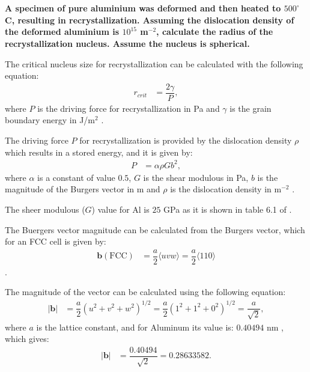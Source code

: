 \newpage
\section{}

\textbf{A specimen of pure aluminium was deformed and then heated to $500^{\circ}$C, resulting in recrystallization. Assuming the dislocation density of the deformed aluminium is $10^{15}$ m$^{-2}$, calculate the radius of the recrystallization nucleus. Assume the nucleus is spherical.}

The critical nucleus size for recrystallization can be calculated with the following equation:
\begin{align}
    \label{eq:r_recrystallization}
    r_{crit}&=\dfrac{2\gamma}{P},
\end{align}
where $P$ is the driving force for recrystallization in Pa and $\gamma$ is the grain boundary energy in J/m$^2$ \citep[p.~283]{rollett2017recrystallization}.

The driving force $P$ for recrystallization is provided by the dislocation density $\rho$ which results in a stored energy, and it is given by:
\begin{align}
    \label{eq:drivin_force}
    P&=\alpha \rho Gb^2,
\end{align}
where $\alpha$ is a constant of value $0.5$, $G$ is the shear modulous in Pa, $b$ is the magnitude of the Burgers vector in m and $\rho$ is the dislocation density in m$^{-2}$ \citep[p.~249]{rollett2017recrystallization}.

The sheer modulous ($G$) value for Al is $25$ GPa as it is shown in table 6.1 of \citet[p.~157]{callister2010materials}.

The Buergers vector magnitude can be calculated from the Burgers vector, which for an FCC cell is given by:
\begin{align}
    \label{eq:fcc_vector}
    \mathbf{b}(\text{FCC})&=\dfrac{a}{2}\langle uvw\rangle=\dfrac{a}{2}\langle110\rangle
\end{align}
\citep[p.~204]{callister2010materials}.

The magnitude of the vector can be calculated using the following equation:
\begin{align}
    \label{eq:vector_magnitude}
    \left|\mathbf{b}\right|&=\dfrac{a}{2}\left(u^{2}+v^{2}+w^{2}\right)^{1/2}=\dfrac{a}{2}\left(1^{2}+1^{2}+0^{2}\right)^{1/2}=\dfrac{a}{\sqrt{2}},
\end{align}
where $a$ is the lattice constant, and for Aluminum its value is: $0.40494$ nm \citep{Xu2011}, which gives:
\begin{align}
    \label{eq:vector_magnitude01}
    \left|\mathbf{b}\right|&=\dfrac{0.40494}{\sqrt{2}}=0.28633582.
\end{align}


